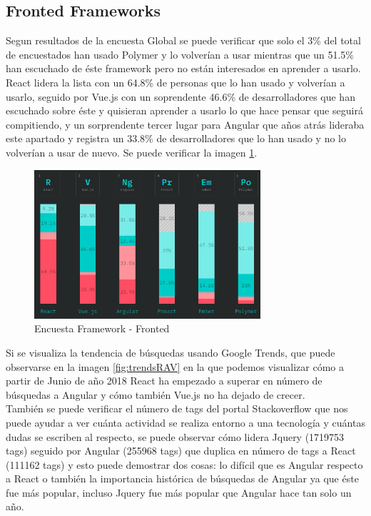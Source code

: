 \documentclass[twocolumns,a4paper]{IEEEtran}
\begin{document}
\subsection{Fronted Frameworks}
Segun resultados de la encuesta Global se puede verificar que solo el 3\% del
total de encuestados han usado Polymer y lo volverían a usar mientras que un
51.5\% han escuchado de éste framework pero no están interesados en aprender
a usarlo. React lidera la lista con un 64.8\% de personas que lo han usado y
volverían a usarlo, seguido por Vue.js con un soprendente 46.6\% de
desarrolladores que han escuchado sobre éste y quisieran aprender a usarlo lo
que hace pensar que seguirá compitiendo, y un sorprendente tercer lugar para
Angular que años atrás lideraba este apartado y registra un 33.8\% de
desarrolladores que lo han usado y no lo volverían a usar de nuevo. Se puede
verificar la imagen \ref{fig:fronted_framework}.

\begin{figure}[ht]
   \centering
      \includegraphics[width=3.3in]{./pictures/frameworks_fronted.png}
   \caption{Encuesta Framework - Fronted}
   \label{fig:fronted_framework}
\end{figure}

Si se visualiza la tendencia de búsquedas usando Google Trends, que puede
observarse en la imagen \ref{fig:trendsRAV} en la que podemos visualizar cómo a
partir de Junio de año 2018 React ha empezado a superar en número de búsquedas
a Angular y cómo también Vue.js no ha dejado de crecer.\\
También se puede verificar el número de tags del portal Stackoverflow que nos
puede ayudar a ver cuánta actividad se realiza entorno a una tecnología y
cuántas dudas se escriben al respecto, se puede observar cómo lidera Jquery
(1719753 tags) seguido por Angular (255968 tags) que duplica en número de tags
a React (111162 tags) y esto puede demostrar dos cosas: lo difícil que es
Angular respecto a React o también la importancia histórica de búsquedas de
Angular ya que éste fue más popular, incluso Jquery fue más popular que Angular
hace tan solo un año.
\end{document}
